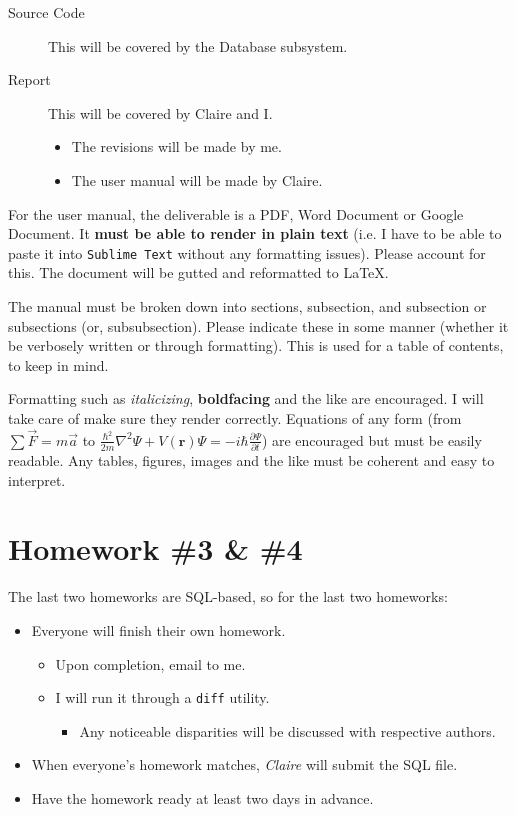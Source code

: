 \documentclass{scrartcl}
\newcommand{\shellcmd}[1]{\texttt{\colorbox{gray!30}{#1}}}
\begin{document}
\begin{description}
    \item [Source Code] This will be covered by the Database subsystem.
    \item [Report] This will be covered by Claire and I.
    \begin{itemize}
        \item The revisions will be made by me.
        \item The user manual will be made by Claire.
    \end{itemize}
\end{description}

For the user manual, the deliverable is a PDF, Word Document or Google Document. It \textbf{must be able to render in plain text} (i.e. I have to be able to paste it into \texttt{Sublime Text} without any formatting issues). Please account for this. The document will be gutted and reformatted to \LaTeX.

The manual must be broken down into sections, subsection, and subsection or subsections (or, subsubsection). Please indicate these in some manner (whether it be verbosely written or through formatting). This is used for a table of contents, to keep in mind.

Formatting such as \textit{italicizing}, \textbf{boldfacing} and the like are encouraged. I will take care of make sure they render correctly. Equations of any form (from $\sum \vec{F} = m\vec{a}$ to $\frac{\hbar^2}{2m}\nabla^2\Psi + V(\mathbf{r})\Psi = -i\hbar \frac{\partial\Psi}{\partial t}$) are encouraged but must be easily readable. Any tables, figures, images and the like must be coherent and easy to interpret.

\section{Homework \#3 \& \#4 }
The last two homeworks are SQL-based, so for the last two homeworks:

\begin{itemize}
    \item Everyone will finish their own homework.
    \begin{itemize}
        \item Upon completion, email to me.
        \item I will run it through a \shellcmd{diff} utility.
        \begin{itemize}
            \item Any noticeable disparities will be discussed with respective authors.
        \end{itemize}
    \end{itemize}
    \item When everyone's homework matches, \textit{Claire} will submit the SQL file.
    \item Have the homework ready at least two days in advance.
\end{itemize}
\end{document}
